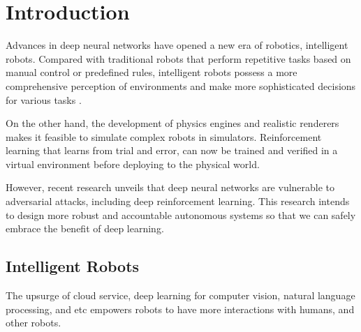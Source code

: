 \chapter{Introduction}
\label{chpt:intro}

Advances in deep neural networks have opened a new era of robotics, intelligent robots. Compared with traditional robots that perform repetitive tasks based on manual control or predefined rules, intelligent robots possess a more comprehensive perception of environments and make more sophisticated decisions for various tasks \citep{wang2018current}.

On the other hand, the development of physics engines and realistic renderers makes it feasible to simulate complex robots in simulators. Reinforcement learning that learns from trial and error, can now be trained and verified in a virtual environment before deploying to the physical world.

However, recent research unveils that deep neural networks are vulnerable to adversarial attacks, including deep reinforcement learning. This research intends to design more robust and accountable autonomous systems so that we can safely embrace the benefit of deep learning.


\section{Intelligent Robots}
\label{sec:intelligent_robot}

The upsurge of cloud service, deep learning for computer vision, natural language processing,  and etc empowers robots to have more interactions with humans, and other robots. 

